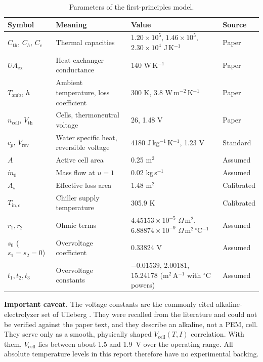 \documentclass[11pt,a4paper]{article}
\newcommand{\Vcell}{V_{\mathrm{cell}}}
\begin{document}
\begin{table}[H]
\centering\small
\caption{Parameters of the first-principles model.}\label{tab:params}
\begin{tabular}{@{}p{2.6cm}p{3.9cm}p{6.2cm}p{1.6cm}@{}}
\toprule
Symbol & Meaning & Value & Source \\
\midrule
$C_{\mathrm{th}}$, $C_h$, $C_c$ & Thermal capacities & $1.20\times10^{5}$, $1.46\times10^{5}$, $2.30\times10^{4}$ J\,K$^{-1}$ & Paper \\
$UA_{\mathrm{ex}}$ & Heat-exchanger conductance & 140 W\,K$^{-1}$ & Paper \\
$T_{\mathrm{amb}}$, $h$ & Ambient temperature, loss coefficient & 300 K, 3.8 W\,m$^{-2}$\,K$^{-1}$ & Paper \\
$n_{\mathrm{cell}}$, $V_{\mathrm{th}}$ & Cells, thermoneutral voltage & 26, 1.48 V & Paper \\
$c_p$, $V_{\mathrm{rev}}$ & Water specific heat, reversible voltage & 4180 J\,kg$^{-1}$\,K$^{-1}$, 1.23 V & Standard \\
$A$ & Active cell area & 0.25 m$^{2}$ & Assumed \\
$\dot m_0$ & Mass flow at $u=1$ & 0.02 kg\,s$^{-1}$ & Assumed \\
$A_s$ & Effective loss area & 1.48 m$^{2}$ & Calibrated \\
$T_{\mathrm{in,c}}$ & Chiller supply temperature & 305.9 K & Calibrated \\
$r_1,r_2$ & Ohmic terms & $4.45153\times10^{-5}$ $\Omega$\,m$^2$, $6.88874\times10^{-9}$ $\Omega$\,m$^2$\,$^\circ$C$^{-1}$ & Assumed \\
$s_0$ ($s_1=s_2=0$) & Overvoltage coefficient & 0.33824 V & Assumed \\
$t_1,t_2,t_3$ & Overvoltage constants & $-0.01539$, 2.00181, 15.24178 (m$^2$\,A$^{-1}$ with $^\circ$C powers) & Assumed \\
\bottomrule
\end{tabular}
\end{table}

\textbf{Important caveat.} The voltage constants are the commonly cited alkaline-electrolyzer set of Ulleberg \cite{ulleberg2003}. They were recalled from the literature and could not be verified against the paper text, and they describe an alkaline, not a PEM, cell. They serve only as a smooth, physically shaped $\Vcell(T,I)$ correlation. With them, $\Vcell$ lies between about 1.5 and 1.9~V over the operating range. All absolute temperature levels in this report therefore have no experimental backing.
\end{document}
